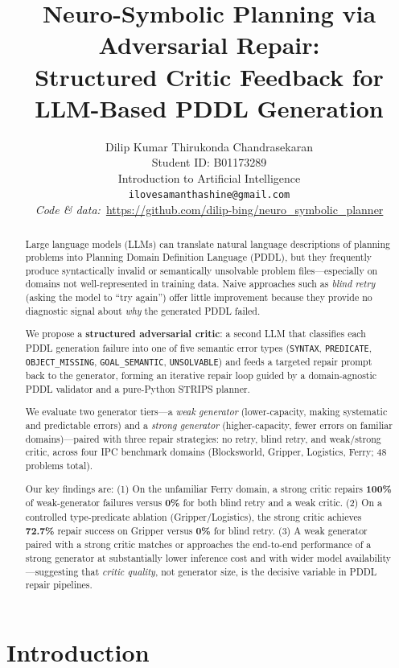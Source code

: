 \documentclass{article}
\title{Neuro-Symbolic Planning via Adversarial Repair:\\Structured Critic Feedback for LLM-Based PDDL Generation}
\author{%
  Dilip Kumar Thirukonda Chandrasekaran \\
  Student ID: B01173289 \\
  Introduction to Artificial Intelligence \\
  \texttt{ilovesamanthashine@gmail.com} \\
  \AND
  \textit{Code \& data:}~\url{https://github.com/dilip-bing/neuro_symbolic_planner} \\
}
\begin{document}
\maketitle

\begin{abstract}
Large language models (LLMs) can translate natural language descriptions of planning
problems into Planning Domain Definition Language (PDDL), but they frequently produce
syntactically invalid or semantically unsolvable problem files---especially on domains
not well-represented in training data.  Naive approaches such as \emph{blind retry}
(asking the model to ``try again'') offer little improvement because they provide no
diagnostic signal about \emph{why} the generated PDDL failed.

We propose a \textbf{structured adversarial critic}: a second LLM that classifies each
PDDL generation failure into one of five semantic error types
(\texttt{SYNTAX}, \texttt{PREDICATE}, \texttt{OBJECT\_MISSING},
\texttt{GOAL\_SEMANTIC}, \texttt{UNSOLVABLE}) and feeds a targeted repair prompt back
to the generator, forming an iterative repair loop guided by a domain-agnostic
PDDL validator and a pure-Python STRIPS planner.

We evaluate two generator tiers---a \emph{weak generator} (lower-capacity, making
systematic and predictable errors) and a \emph{strong generator} (higher-capacity, fewer
errors on familiar domains)---paired with three repair strategies: no retry, blind
retry, and weak/strong critic, across four IPC benchmark domains (Blocksworld, Gripper,
Logistics, Ferry; 48 problems total).

Our key findings are:
(1) On the unfamiliar Ferry domain, a strong critic repairs \textbf{100\%} of weak-generator
failures versus \textbf{0\%} for both blind retry and a weak critic.
(2) On a controlled type-predicate ablation (Gripper/Logistics), the strong critic achieves
\textbf{72.7\%} repair success on Gripper versus \textbf{0\%} for blind retry.
(3) A weak generator paired with a strong critic matches or approaches the end-to-end
performance of a strong generator at substantially lower inference cost and with
wider model availability---suggesting that \emph{critic quality}, not generator
size, is the decisive variable in PDDL repair pipelines.
\end{abstract}

\section{Introduction}
\label{sec:intro}
\end{document}
